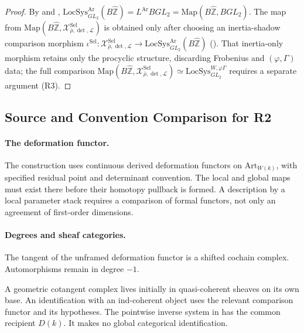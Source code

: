 \begin{proof}
By  and
,
\(\mathrm{LocSys}^{\mathrm{Ar}}_{GL_{2}}(B\widehat{\mathbb{Z}})=L^{\mathrm{Ar}}BGL_{2}=\mathrm{Map}(B\widehat{\mathbb{Z}},BGL_{2})\).
The map from
\(\mathrm{Map}(B\widehat{\mathbb{Z}},\mathcal{X}^{\mathrm{Sel}}_{\bar\rho,\det,\mathcal{L}})\)
is obtained only after choosing an inertia-shadow comparison morphism
\(\iota^{\mathrm{Sel}}\colon\mathcal{X}^{\mathrm{Sel}}_{\bar\rho,\det,\mathcal{L}}\to\mathrm{LocSys}^{\mathrm{Ar}}_{GL_{2}}(B\widehat{\mathbb{Z}})\)
(). That inertia-only morphism retains only the procyclic structure,
discarding Frobenius and \((\varphi,\Gamma)\) data; the full comparison
\(\mathrm{Map}(B\widehat{\mathbb{Z}},\mathcal{X}^{\mathrm{Sel}}_{\bar\rho,\det,\mathcal{L}})\simeq\mathrm{LocSys}^{W,\varphi\Gamma}_{GL_{2}}\)
requires a separate argument (R3).
\end{proof}

\subsection{Source and Convention Comparison for R2}
\label{v4-arith:bzn-sub:R2-obstruction-analysis}

\paragraph{The deformation functor.}
The construction uses continuous derived deformation functors on
\(\mathrm{Art}_{W(k)}\), with specified residual point and
determinant convention. The local and global maps must exist there
before their homotopy pullback is formed. A description by a local
parameter stack requires a comparison of formal functors, not only
an agreement of first-order dimensions.

\paragraph{Degrees and sheaf categories.}
The tangent of the unframed deformation functor is a shifted cochain
complex. Automorphisms remain in degree \(-1\).

A geometric cotangent complex lives initially in quasi-coherent
sheaves on its own base. An identification with an ind-coherent
object uses the relevant comparison functor and its hypotheses.
The pointwise inverse system in
 has the common
recipient \(D(k)\). It makes no global categorical identification.

